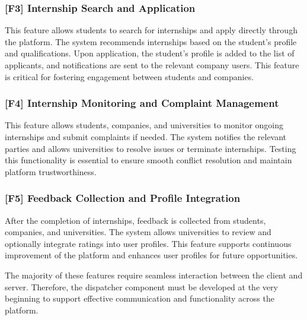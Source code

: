 \subsubsection*{[F3] Internship Search and Application}
This feature allows students to search for internships and apply directly through the platform. The system recommends internships based on the student’s profile and qualifications. Upon application, the student’s profile is added to the list of applicants, and notifications are sent to the relevant company users. This feature is critical for fostering engagement between students and companies.

\subsubsection*{[F4] Internship Monitoring and Complaint Management}
This feature allows students, companies, and universities to monitor ongoing internships and submit complaints if needed. The system notifies the relevant parties and allows universities to resolve issues or terminate internships. Testing this functionality is essential to ensure smooth conflict resolution and maintain platform trustworthiness.

\subsubsection*{[F5] Feedback Collection and Profile Integration}
After the completion of internships, feedback is collected from students, companies, and universities. The system allows universities to review and optionally integrate ratings into user profiles. This feature supports continuous improvement of the platform and enhances user profiles for future opportunities.

The majority of these features require seamless interaction between the client and server. Therefore, the dispatcher component must be developed at the very beginning to support effective communication and functionality across the platform.